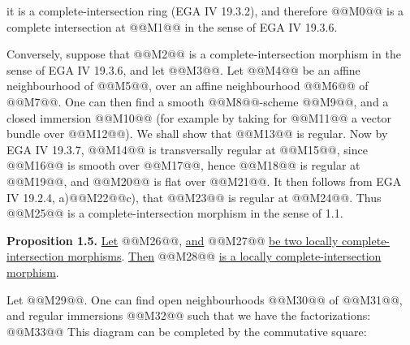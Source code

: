 it is a complete-intersection ring (EGA IV 19.3.2), and therefore @@M0@@ is a complete intersection at @@M1@@ in the sense of EGA IV 19.3.6.

Conversely, suppose that @@M2@@ is a complete-intersection morphism in the sense of EGA IV 19.3.6, and let @@M3@@. Let @@M4@@ be an affine neighbourhood of @@M5@@, over an affine neighbourhood @@M6@@ of @@M7@@. One can then find a smooth @@M8@@-scheme @@M9@@, and a closed immersion @@M10@@ (for example by taking for @@M11@@ a vector bundle over @@M12@@). We shall show that @@M13@@ is regular. Now by EGA IV 19.3.7, @@M14@@ is transversally regular at @@M15@@, since @@M16@@ is smooth over @@M17@@, hence @@M18@@ is regular at @@M19@@, and @@M20@@ is flat over @@M21@@. It then follows from EGA IV 19.2.4, a)@@M22@@c), that @@M23@@ is regular at @@M24@@. Thus @@M25@@ is a complete-intersection morphism in the sense of 1.1.

\textbf{Proposition 1.5.} \uline{Let} @@M26@@, \uline{and} @@M27@@ \uline{be two locally complete-intersection morphisms}. \uline{Then} @@M28@@ \uline{is a locally complete-intersection morphism}.

Let @@M29@@. One can find open neighbourhoods @@M30@@ of @@M31@@, and regular immersions @@M32@@ such that we have the factorizations:
@@M33@@
This diagram can be completed by the commutative square:
